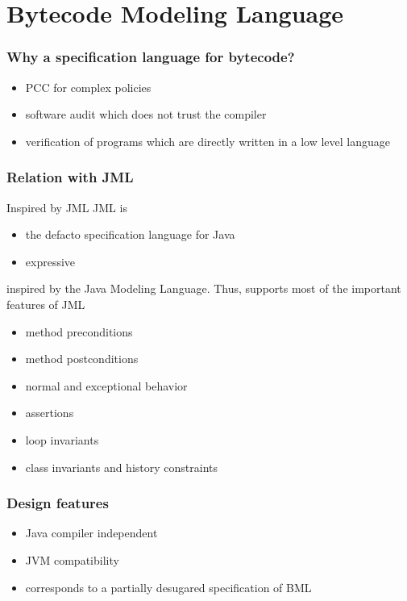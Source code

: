 \documentclass{beamer}
\begin{document}

\section{Bytecode Modeling Language}
\begin{frame}[shrink]
\frametitle{Why a specification language for bytecode?}
   \begin{itemize}
     \item PCC for complex policies 
     \item software audit which does not trust the compiler
     \item verification of programs which are directly written in a low level language
   \end{itemize}  
\end{frame}

\begin{frame}[shrink]\frametitle{Relation with JML}
  
  \begin{block}{Inspired by JML}
      JML is 
      \begin{itemize}
	  \item the defacto specification language for Java
	   \item expressive 
	\end{itemize}
  \end{block}

    inspired by the Java Modeling Language. Thus, supports most of the important features of JML
         \begin{itemize}
	    \item method preconditions
	     \item method postconditions
	      \item normal and exceptional behavior
	       \item assertions
	        \item loop invariants 
		 \item class invariants and history constraints 
	 \end{itemize}
        
\end{frame}


\begin{frame}[shrink]\frametitle{Design features}
\begin{itemize}
     \item Java compiler independent
     \item JVM compatibility
     \item corresponds to a partially desugared specification of BML
   
   \end{itemize} 
\end{frame}
\end{document}
